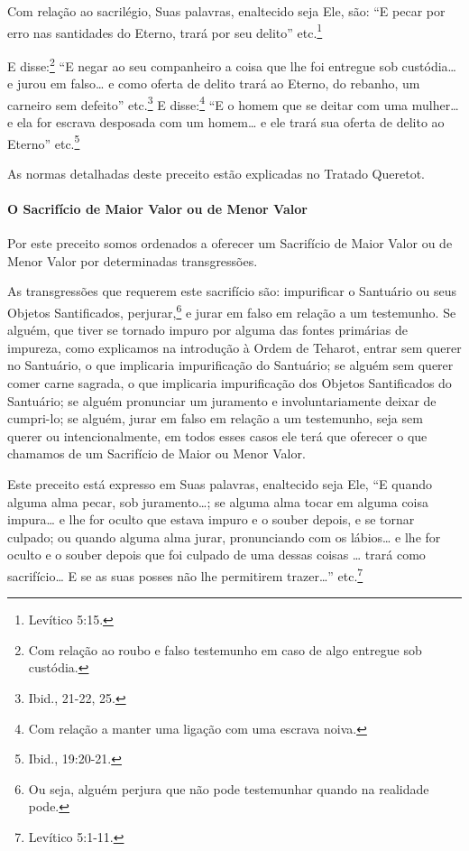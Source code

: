Com relação ao sacrilégio, Suas palavras, enaltecido seja Ele, são: ``E
pecar por erro nas santidades do Eterno, trará por seu delito'' etc.\footnote{Levítico 5:15.}

E disse:\footnote{Com relação ao roubo e falso testemunho em caso de algo entregue sob
  custódia.} ``E negar ao seu companheiro a coisa que
lhe foi entregue sob custódia\ldots{} e jurou em falso\ldots{} e como
oferta de delito trará ao Eterno, do rebanho, um carneiro sem defeito''
etc.\footnote{Ibid., 21-22, 25.} E disse:\footnote{Com relação a manter uma ligação com uma escrava noiva.} ``E o homem que
se deitar com uma mulher\ldots{} e ela for escrava desposada com um
homem\ldots{} e ele trará sua oferta de delito ao Eterno'' etc.\footnote{Ibid.,
19:20-21.}

As normas detalhadas deste preceito estão explicadas no Tratado
Queretot.

\paragraph{O Sacrifício de Maior Valor ou de Menor Valor}

Por este preceito somos ordenados a oferecer um Sacrifício de Maior
Valor ou de Menor Valor por determinadas transgressões.

As transgressões que requerem este sacrifício são: impurificar o
Santuário ou seus Objetos Santificados, perjurar,\footnote{Ou seja, alguém perjura que não pode testemunhar quando na realidade
  pode.} e
jurar em falso em relação a um testemunho. Se alguém, que tiver se
tornado impuro por alguma das fontes primárias de impureza, como explicamos na
introdução à Ordem de Teharot, entrar sem querer no Santuário, o que
implicaria impurificação do Santuário; se alguém sem querer comer carne
sagrada, o que implicaria impurificação dos Objetos Santificados do
Santuário; se alguém pronunciar um juramento e involuntariamente deixar
de cumpri-lo; se alguém, jurar em falso em relação a um testemunho, seja
sem querer ou intencionalmente, em todos esses casos ele terá que
oferecer o que chamamos de um Sacrifício de Maior ou Menor Valor.

Este preceito está expresso em Suas palavras, enaltecido seja Ele, ``E
quando alguma alma pecar, sob juramento\ldots{}; se alguma alma tocar em
alguma coisa impura\ldots{} e lhe for oculto que estava impuro e o souber
depois, e se tornar culpado; ou quando alguma alma jurar, pronunciando
com os lábios\ldots{} e lhe for oculto e o souber depois que foi culpado de
uma dessas coisas \ldots{} trará como sacrifício\ldots{} E se as suas posses não
lhe permitirem trazer\ldots{}'' etc.\footnote{Levítico 5:1-11.}


